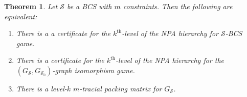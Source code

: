 \documentclass[11pt,a4paper]{article}
\theoremstyle{plain}
\newtheorem{thm}{Theorem}[section]
\theoremstyle{remark}
\theoremstyle{definition}
\def\calS{{\mathcal S}} \def\calT{{\mathcal T}} \def\calU{{\mathcal U}}
\begin{document}
\begin{thm}\label{thm:reduction-npa-BCS-GI}
    Let $\calS$ be a BCS with $m$ constraints. Then the following are equivalent:
    \begin{enumerate}[label = (\roman*)]
        \item\label{itm:reduction-npa-BCS-GI-1} There is a a certificate for the $k^{\text{th}}$-level of the NPA hierarchy for $\calS$-BCS game.
        \item\label{itm:reduction-npa-BCS-GI-2} There is a certificate for the $k^{\text{th}}$-level of the NPA hierarchy for the $(G_{\calS}, G_{\calS_0})$-graph isomorphism game.
        \item \label{itm:reduction-npa-BCS-GI-3} There is a level-$k$ $m$-tracial packing matrix for $G_{\calS}$.
\end{enumerate}
\end{thm}
\end{document}
